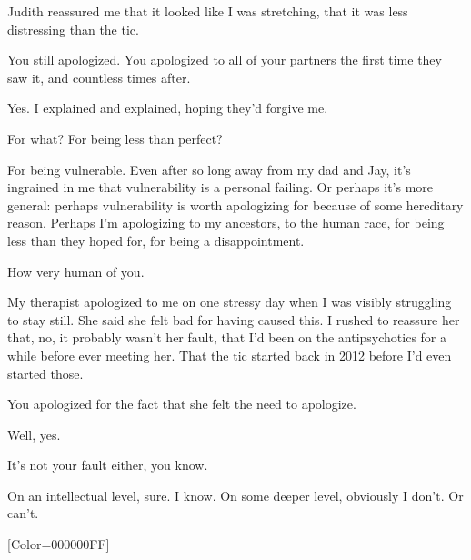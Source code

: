 \begin{paracol}{2}
\begin{leftcolumn}
Judith reassured me that it looked like I was stretching, that it was less distressing than the tic.

\begin{ally}
You still apologized. You apologized to all of your partners the first time they saw it, and countless times after.
\end{ally}
Yes. I explained and explained, hoping they'd forgive me.

\begin{ally}
For what? For being less than perfect?
\end{ally}
For being vulnerable. Even after so long away from my dad and Jay, it's ingrained in me that vulnerability is a personal failing. Or perhaps it's more general: perhaps vulnerability is worth apologizing for because of some hereditary reason. Perhaps I'm apologizing to my ancestors, to the human race, for being less than they hoped for, for being a disappointment.

\begin{ally}
How very human of you.
\end{ally}
My therapist apologized to me on one stressy day when I was visibly struggling to stay still. She said she felt bad for having caused this. I rushed to reassure her that, no, it probably wasn't her fault, that I'd been on the antipsychotics for a while before ever meeting her. That the tic started back in 2012 before I'd even started those.

\begin{ally}
You apologized for the fact that she felt the need to apologize.
\end{ally}
Well, yes.

\begin{ally}
It's not your fault either, you know.
\end{ally}
On an intellectual level, sure. I know. On some deeper level, obviously I don't. Or can't.
\newpage
\end{leftcolumn}
\end{paracol}
\resetbackgroundcolor

\renewfontfamily{}[Color=000000FF]
